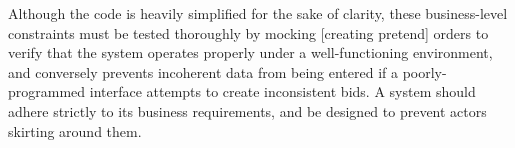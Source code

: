 \documentclass[journal]{IEEEtran}
\begin{document}
	Although the code is heavily simplified for the sake of clarity, these business-level constraints must be tested thoroughly by mocking [creating pretend] orders to verify that the system operates properly under a well-functioning environment, and conversely prevents incoherent data from being entered if a poorly-programmed interface attempts to create inconsistent bids. A system should adhere strictly to its business requirements, and be designed to prevent actors skirting around them.
\end{document}
